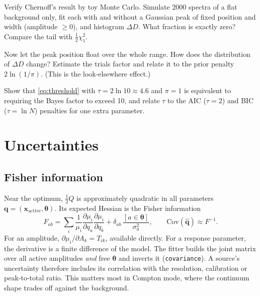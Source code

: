 \documentclass[11pt]{article}
\newcounter{exercise}[section]
\newcommand{\vth}{\bm{\theta}}
\newcommand{\vx}{\bm{x}}
\newcommand{\code}[1]{\texttt{#1}}
\begin{document}
\begin{exercise}[P]
Verify Chernoff's result by toy Monte Carlo. Simulate 2000 spectra of a flat background only, fit each with and without a Gaussian peak of fixed position and width (amplitude $\ge0$), and histogram $\Delta D$. What fraction is exactly zero? Compare the tail with $\tfrac12\chi^2_1$.
\end{exercise}

\begin{exercise}[R]
Now let the peak position float over the whole range. How does the distribution of $\Delta D$ change? Estimate the trials factor and relate it to the prior penalty $2\ln(1/\pi)$. (This is the look-elsewhere effect.)
\end{exercise}

\begin{exercise}[A]
Show that \cref{eq:threshold} with $\tau = 2\ln 10 \approx 4.6$ and $\pi = 1$ is equivalent to requiring the Bayes factor to exceed 10, and relate $\tau$ to the AIC ($\tau=2$) and BIC ($\tau=\ln N$) penalties for one extra parameter.
\end{exercise}

\section{Uncertainties}\label{sec:uncertainty}
\subsection{Fisher information}
Near the optimum, $\tfrac12 Q$ is approximately quadratic in all parameters $\bm q = (\vx_\text{active},\vth)$. Its expected Hessian is the Fisher information
\begin{equation}
F_{ab} = \sum_i \frac{1}{\mu_i}\frac{\partial\mu_i}{\partial q_a}\frac{\partial\mu_i}{\partial q_b} + \delta_{ab}\,\frac{[a\in\vth]}{\sigma_a^2},\qquad \mathrm{Cov}(\hat{\bm q}) \approx F^{-1}. \label{eq:fisher}
\end{equation}
For an amplitude, $\partial\mu_i/\partial A_k = T_{ik}$, available directly. For a response parameter, the derivative is a finite difference of the model. The fitter builds the joint matrix over all active amplitudes \emph{and} free $\vth$ and inverts it (\code{covariance}). A source's uncertainty therefore includes its correlation with the resolution, calibration or peak-to-total ratio. This matters most in Compton mode, where the continuum shape trades off against the background.
\end{document}
